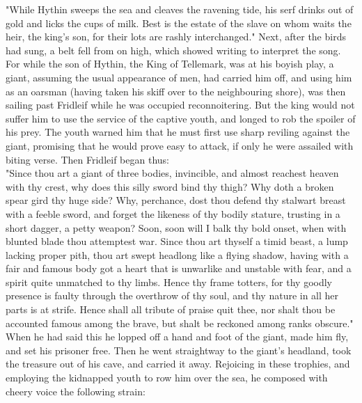 \documentclass[10pt,a4paper]{report}
\begin{document}
"While Hythin sweeps the sea and cleaves the ravening tide, his serf drinks out of gold and licks the cups of milk. Best is the estate of the slave on whom waits the heir, the king's son, for their lots are rashly interchanged." Next, after the birds had sung, a belt fell from on high, which showed writing to interpret the song. For while the son of Hythin, the King of Tellemark, was at his boyish play, a giant, assuming the usual appearance of men, had carried him off, and using him as an oarsman (having taken his skiff over to the neighbouring shore), was then sailing past Fridleif while he was occupied reconnoitering. But the king would not suffer him to use the service of the captive youth, and longed to rob the spoiler of his prey. The youth warned him that he must first use sharp reviling against the giant, promising that he would prove easy to attack, if only he were assailed with biting verse. Then Fridleif began thus:\\

"Since thou art a giant of three bodies, invincible, and almost reachest heaven with thy crest, why does this silly sword bind thy thigh? Why doth a broken spear gird thy huge side? Why, perchance, dost thou defend thy stalwart breast with a feeble sword, and forget the likeness of thy bodily stature, trusting in a short dagger, a petty weapon? Soon, soon will I balk thy bold onset, when with blunted blade thou attemptest war. Since thou art thyself a timid beast, a lump lacking proper pith, thou art swept headlong like a flying shadow, having with a fair and famous body got a heart that is unwarlike and unstable with fear, and a spirit quite unmatched to thy limbs. Hence thy frame totters, for thy goodly presence is faulty through the overthrow of thy soul, and thy nature in all her parts is at strife. Hence shall all tribute of praise quit thee, nor shalt thou be accounted famous among the brave, but shalt be reckoned among ranks obscure."\\

When he had said this he lopped off a hand and foot of the giant, made him fly, and set his prisoner free. Then he went straightway to the giant's headland, took the treasure out of his cave, and carried it away. Rejoicing in these trophies, and employing the kidnapped youth to row him over the sea, he composed with cheery voice the following strain:\\
\end{document}

